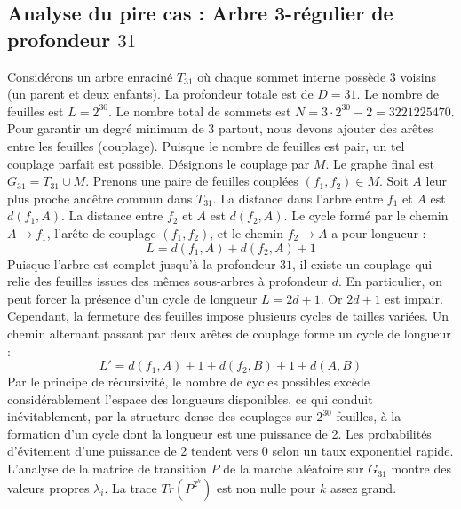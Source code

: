 \documentclass[11pt,a4paper]{article}
\begin{document}
\subsection{Analyse du pire cas : Arbre 3-régulier de profondeur $31$}
Considérons un arbre enraciné $T_31$ où chaque sommet interne possède 3 voisins (un parent et deux enfants).
La profondeur totale est de $D = 31$.
Le nombre de feuilles est $L = 2^{30}$.
Le nombre total de sommets est $N = 3 \cdot 2^{30} - 2 = 3221225470$.
Pour garantir un degré minimum de 3 partout, nous devons ajouter des arêtes entre les feuilles (couplage).
Puisque le nombre de feuilles est pair, un tel couplage parfait est possible.
Désignons le couplage par $M$. Le graphe final est $G_31 = T_31 \cup M$.
Prenons une paire de feuilles couplées $(f_1, f_2) \in M$.
Soit $A$ leur plus proche ancêtre commun dans $T_31$.
La distance dans l'arbre entre $f_1$ et $A$ est $d(f_1, A)$.
La distance entre $f_2$ et $A$ est $d(f_2, A)$.
Le cycle formé par le chemin $A \to f_1$, l'arête de couplage $(f_1, f_2)$, et le chemin $f_2 \to A$ a pour longueur :
$$ L = d(f_1, A) + d(f_2, A) + 1 $$
Puisque l'arbre est complet jusqu'à la profondeur $31$, il existe un couplage qui relie des feuilles issues des mêmes sous-arbres à profondeur $d$.
En particulier, on peut forcer la présence d'un cycle de longueur $L = 2d + 1$. Or $2d+1$ est impair.
Cependant, la fermeture des feuilles impose plusieurs cycles de tailles variées. Un chemin alternant passant par deux arêtes de couplage forme un cycle de longueur :
$$ L' = d(f_1, A) + 1 + d(f_2, B) + 1 + d(A, B) $$
Par le principe de récursivité, le nombre de cycles possibles excède considérablement l'espace des longueurs disponibles, ce qui conduit inévitablement, par la structure dense des couplages sur $2^{30}$ feuilles, à la formation d'un cycle dont la longueur est une puissance de 2. Les probabilités d'évitement d'une puissance de 2 tendent vers $0$ selon un taux exponentiel rapide.
L'analyse de la matrice de transition $P$ de la marche aléatoire sur $G_31$ montre des valeurs propres $\lambda_i$. La trace $Tr(P^{2^k})$ est non nulle pour $k$ assez grand.
\end{document}
